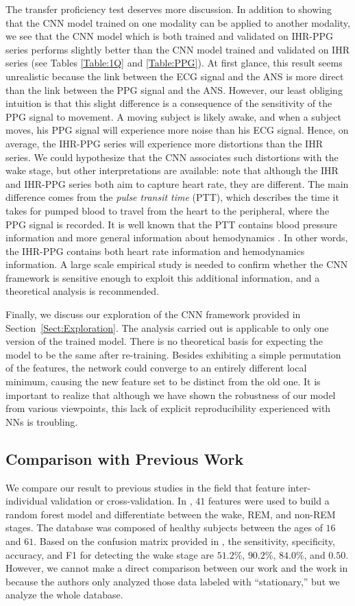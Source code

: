 \documentclass[10pt,a4paper,english]{amsart}
\begin{document}
The transfer proficiency test deserves more discussion. In addition to showing that the CNN model trained on one modality can be applied to another modality, we see that the CNN model which is both trained and validated on IHR-PPG series performs slightly better than the CNN model trained and validated on IHR series (see Tables \ref{Table:1Q} and \ref{Table:PPG}).
At first glance, this result seems unrealistic because the link between the ECG signal and the ANS is more direct than the link between the PPG signal and the ANS. 
However, our least obliging intuition is that this slight difference is a consequence of the sensitivity of the PPG signal to movement. A moving subject is likely awake, and when a subject moves, his PPG signal will experience more noise than his ECG signal. Hence, on average, the IHR-PPG series will experience more distortions than the IHR series. We could hypothesize that the CNN associates such distortions with the wake stage, but other interpretations are available:  note that although the IHR and IHR-PPG series both aim to capture heart rate, they are different. The main difference comes from the {\em pulse transit time} (PTT), which describes the time it takes for pumped blood to travel from the heart to the peripheral, where the PPG signal is recorded. It is well known that the PTT contains blood pressure information and more general information about hemodynamics \cite{Mukkamala2015}. In other words, the IHR-PPG contains both heart rate information and hemodynamics information. A large scale empirical study is needed to confirm whether the CNN framework is sensitive enough to exploit this additional information, and a theoretical analysis is recommended.

Finally, we discuss our exploration of the CNN framework provided in Section~\ref{Sect:Exploration}.  The analysis carried out is applicable to only one version of the trained model.  There is no theoretical basis for expecting the model to be the same after re-training. Besides exhibiting a simple permutation of the features, the network could converge to an entirely different local minimum, causing the new feature set to be distinct from the old one. It is important to realize that although we have shown the robustness of our model from various viewpoints, this lack of explicit reproducibility experienced with NNs is troubling. 

\subsection{Comparison with Previous Work}
We compare our result to previous studies in the field that feature inter-individual validation or cross-validation.
In \cite{Xiao2013}, $41$ features were used to build a random forest model and differentiate between the wake, REM, and non-REM stages. The database was composed of healthy subjects between the ages of $16$ and $61$. 
Based on the confusion matrix provided in \cite{Xiao2013}, the sensitivity, specificity, accuracy, and F1 for detecting the wake stage are $51.2$\%, $90.2$\%, $84.0$\%, and $0.50$. However, we cannot make a direct comparison between our work and the work in \cite{Xiao2013} because the authors only analyzed those data labeled with ``stationary,'' but we analyze the whole database. 
%
\end{document}
